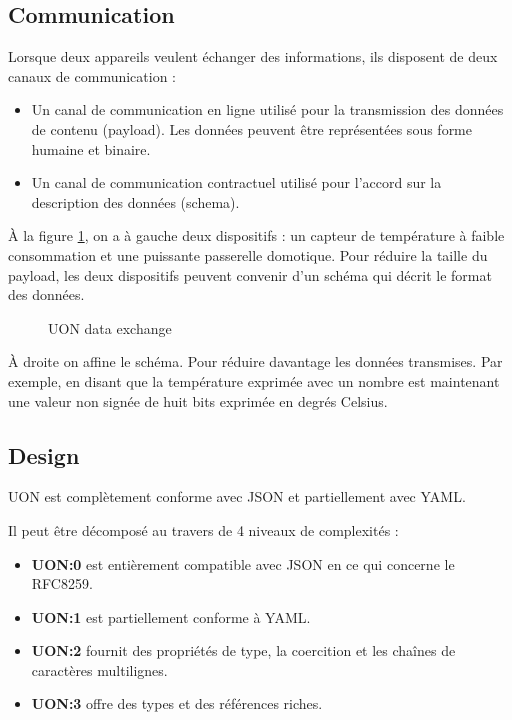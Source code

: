 \documentclass[
    iict, %
    il, %
]{heig-tb}
\begin{document}
\subsection{Communication}
Lorsque deux appareils veulent échanger des informations, ils disposent de deux canaux de communication :
\begin{itemize}
    \item Un canal de communication en ligne utilisé pour la transmission des données de contenu (payload). Les données peuvent être représentées sous forme humaine et binaire.
    \item Un canal de communication contractuel utilisé pour l'accord sur la description des données (schema).
\end{itemize}

\vspace{\parskip}

À la figure \ref*{data-exchange}, on a à gauche deux dispositifs : un capteur de température à faible consommation
et une puissante passerelle domotique. Pour réduire la taille du payload, les deux dispositifs peuvent convenir d'un schéma qui décrit le format des données.

\begin{figure}[!h]
    \begin{center}
    \end{center}
    \caption[UON data exchange]{\label{data-exchange}UON data exchange}
\end{figure}

À droite on affine le schéma. Pour réduire davantage les données transmises.
Par exemple, en disant que la température exprimée avec un nombre est maintenant une valeur non signée de huit bits exprimée en degrés Celsius.

\subsection{Design}
UON est complètement conforme avec JSON et partiellement avec YAML.

Il peut être décomposé au travers de 4 niveaux de complexités :
\begin{itemize}
    \item \textbf{UON:0} est entièrement compatible avec JSON en ce qui concerne le RFC8259.
    \item \textbf{UON:1} est partiellement conforme à YAML.
    \item \textbf{UON:2} fournit des propriétés de type, la coercition et les chaînes de caractères multilignes.
    \item \textbf{UON:3} offre des types et des références riches.
\end{itemize}
\end{document}
